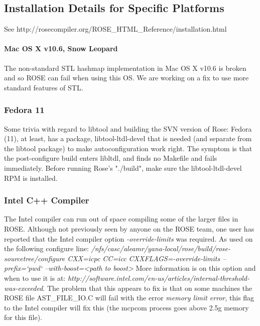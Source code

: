 \subsection{Installation Details for Specific Platforms}

See http://rosecompiler.org/ROSE\_HTML\_Reference/installation.html


\paragraph{Mac OS X v10.6, Snow Leopard}
   The non-standard STL hashmap implementation in Mac OS X v10.6 is broken and so ROSE
can fail when using this OS.  We are working on a fix to use more standard
features of STL.

\subsubsection{Fedora 11}
   Some trivia with regard to libtool and building the SVN version of Rose:
Fedora (11), at least, has a package, libtool-ltdl-devel that is needed (and separate from
the libtool package) to make autoconfiguration work right.  The symptom is that the
post-configure build enters libltdl, and finds no Makefile and fails immediately.
Before running Rose's "./build", make sure the libtool-ltdl-devel RPM is installed.

\subsubsection{Intel C++ Compiler}
The Intel compiler can run out of space compiling some of the larger files in ROSE.
Although not previously seen by anyone on the ROSE team, one user has reported
that the Intel compiler option {\em -override-limits} was required.  As used on
the following configure line:
{\em /nfs/casc/aleamr/yana-local/rose/build/rose-sourcetree/configure CXX=icpc CC=icc CXXFLAGS=-override-limits --prefix=`pwd` --with-boost=<path to boost>}
More information is on this option and when to use it is at:
{\em http://software.intel.com/en-us/articles/internal-threshold-was-exceeded}.
The problem that this appears to fix is that on some machines the ROSE 
file AST\_FILE\_IO.C will fail with the error {\em memory limit error},
this flag to the Intel compiler will fix this (the mcpcom process goes above 
2.5g memory for this file).


